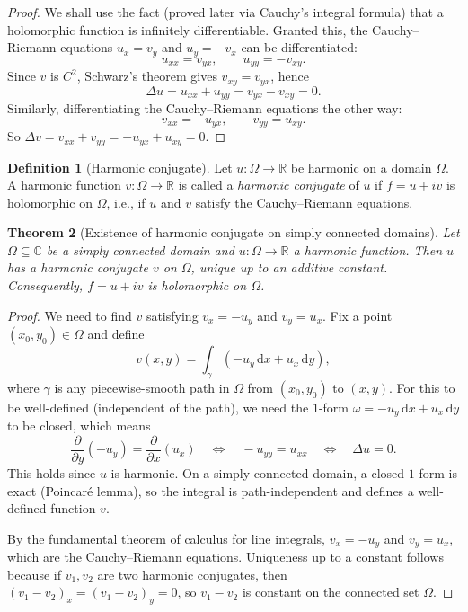 \documentclass[12pt,a4paper,openany]{book}
\theoremstyle{definition}
\newtheorem{definition}{Definition}[chapter]
\theoremstyle{plain}
\newtheorem{theorem}[definition]{Theorem}
\theoremstyle{remark}
\newcommand{\C}{\mathbb{C}}
\newcommand{\R}{\mathbb{R}}
\newcommand{\dd}{\mathrm{d}}
\begin{document}
\begin{proof}
We shall use the fact (proved later via Cauchy's integral formula) that a holomorphic function is infinitely differentiable. Granted this, the Cauchy--Riemann equations $u_x = v_y$ and $u_y = -v_x$ can be differentiated:
\[
  u_{xx} = v_{yx}, \qquad u_{yy} = -v_{xy}.
\]
Since $v$ is $C^2$, Schwarz's theorem gives $v_{xy} = v_{yx}$, hence
\[
  \Delta u = u_{xx}+u_{yy} = v_{yx}-v_{xy} = 0.
\]
Similarly, differentiating the Cauchy--Riemann equations the other way:
\[
  v_{xx} = -u_{yx}, \qquad v_{yy} = u_{xy}.
\]
So $\Delta v = v_{xx}+v_{yy} = -u_{yx}+u_{xy} = 0$.
\end{proof}

\begin{definition}[Harmonic conjugate]
\label{def:harmonic-conjugate}
Let $u:\Omega\to\R$ be harmonic on a domain $\Omega$. A harmonic function $v:\Omega\to\R$ is called a \emph{harmonic conjugate} of $u$ if $f = u+iv$ is holomorphic on $\Omega$, i.e., if $u$ and $v$ satisfy the Cauchy--Riemann equations.
\end{definition}

\begin{theorem}[Existence of harmonic conjugate on simply connected domains]
\label{thm:harmonic-conjugate}
Let $\Omega\subseteq\C$ be a simply connected domain and $u:\Omega\to\R$ a harmonic function. Then $u$ has a harmonic conjugate $v$ on $\Omega$, unique up to an additive constant. Consequently, $f = u+iv$ is holomorphic on $\Omega$.
\end{theorem}

\begin{proof}
We need to find $v$ satisfying $v_x = -u_y$ and $v_y = u_x$. Fix a point $(x_0,y_0)\in\Omega$ and define
\[
  v(x,y) = \int_\gamma \left(-u_y\,\dd x + u_x\,\dd y\right),
\]
where $\gamma$ is any piecewise-smooth path in $\Omega$ from $(x_0,y_0)$ to $(x,y)$. For this to be well-defined (independent of the path), we need the $1$-form $\omega = -u_y\,\dd x + u_x\,\dd y$ to be closed, which means
\[
  \frac{\partial}{\partial y}(-u_y) = \frac{\partial}{\partial x}(u_x) \quad\Longleftrightarrow\quad -u_{yy} = u_{xx} \quad\Longleftrightarrow\quad \Delta u = 0.
\]
This holds since $u$ is harmonic. On a simply connected domain, a closed $1$-form is exact (Poincar\'e lemma), so the integral is path-independent and defines a well-defined function $v$.

By the fundamental theorem of calculus for line integrals, $v_x = -u_y$ and $v_y = u_x$, which are the Cauchy--Riemann equations. Uniqueness up to a constant follows because if $v_1,v_2$ are two harmonic conjugates, then $(v_1-v_2)_x = (v_1-v_2)_y = 0$, so $v_1-v_2$ is constant on the connected set $\Omega$.
\end{proof}
\end{document}
